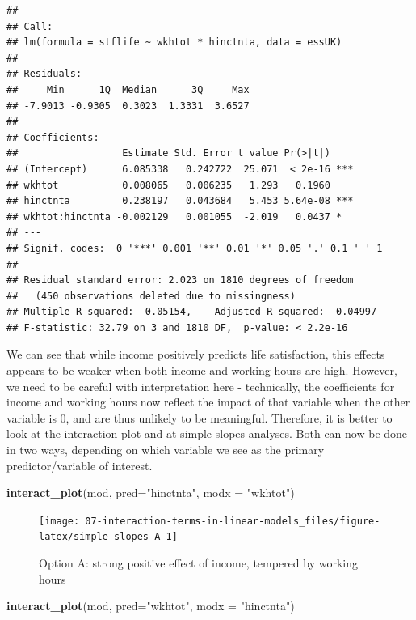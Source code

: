 \documentclass[
]{book}
\newenvironment{Shaded}{\begin{snugshade}}{\end{snugshade}}
\newcommand{\DataTypeTok}[1]{\textcolor[rgb]{0.13,0.29,0.53}{#1}}
\newcommand{\KeywordTok}[1]{\textcolor[rgb]{0.13,0.29,0.53}{\textbf{#1}}}
\newcommand{\NormalTok}[1]{#1}
\newcommand{\StringTok}[1]{\textcolor[rgb]{0.31,0.60,0.02}{#1}}
\begin{document}
\begin{verbatim}
## 
## Call:
## lm(formula = stflife ~ wkhtot * hinctnta, data = essUK)
## 
## Residuals:
##     Min      1Q  Median      3Q     Max 
## -7.9013 -0.9305  0.3023  1.3331  3.6527 
## 
## Coefficients:
##                  Estimate Std. Error t value Pr(>|t|)    
## (Intercept)      6.085338   0.242722  25.071  < 2e-16 ***
## wkhtot           0.008065   0.006235   1.293   0.1960    
## hinctnta         0.238197   0.043684   5.453 5.64e-08 ***
## wkhtot:hinctnta -0.002129   0.001055  -2.019   0.0437 *  
## ---
## Signif. codes:  0 '***' 0.001 '**' 0.01 '*' 0.05 '.' 0.1 ' ' 1
## 
## Residual standard error: 2.023 on 1810 degrees of freedom
##   (450 observations deleted due to missingness)
## Multiple R-squared:  0.05154,	Adjusted R-squared:  0.04997 
## F-statistic: 32.79 on 3 and 1810 DF,  p-value: < 2.2e-16
\end{verbatim}

We can see that while income positively predicts life satisfaction, this effects appears to be weaker when both income and working hours are high. However, we need to be careful with interpretation here - technically, the coefficients for income and working hours now reflect the impact of that variable when the other variable is 0, and are thus unlikely to be meaningful. Therefore, it is better to look at the interaction plot and at simple slopes analyses. Both can now be done in two ways, depending on which variable we see as the primary predictor/variable of interest.

\begin{Shaded}
\begin{Highlighting}[]
\KeywordTok{interact_plot}\NormalTok{(mod, }\DataTypeTok{pred=}\StringTok{"hinctnta"}\NormalTok{, }\DataTypeTok{modx =} \StringTok{"wkhtot"}\NormalTok{)}
\end{Highlighting}
\end{Shaded}

\begin{figure}

{\centering \texttt{[image: 07-interaction-terms-in-linear-models\_files/figure-latex/simple-slopes-A-1]} 

}

\caption{Option A: strong positive effect of income, tempered by working hours}\label{fig:simple-slopes-A}
\end{figure}

\begin{Shaded}
\begin{Highlighting}[]
\KeywordTok{interact_plot}\NormalTok{(mod, }\DataTypeTok{pred=}\StringTok{"wkhtot"}\NormalTok{, }\DataTypeTok{modx =} \StringTok{"hinctnta"}\NormalTok{)}
\end{Highlighting}
\end{Shaded}
\end{document}

